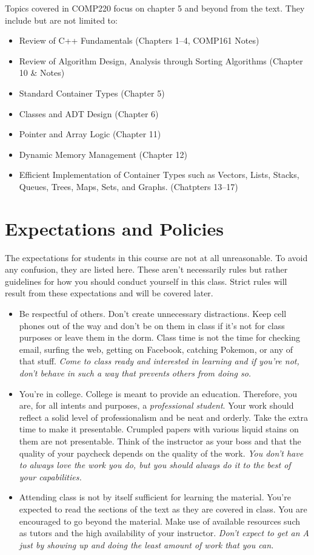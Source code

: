 \documentclass[nobib]{tufte-handout}
\begin{document}
Topics covered in COMP220 focus on chapter 5 and beyond from the text. They include but are not limited to:
\begin{itemize}
\item Review of C++ Fundamentals (Chapters 1--4, COMP161 Notes)
\item Review of Algorithm Design, Analysis through Sorting Algorithms (Chapter 10 \& Notes)
\item Standard Container Types (Chapter 5)
\item Classes and ADT Design (Chapter 6)
\item Pointer and Array Logic (Chapter 11)
\item Dynamic Memory Management (Chapter 12)
\item Efficient Implementation of Container Types such as Vectors, Lists, Stacks, Queues, Trees, Maps, Sets, and Graphs. (Chatpters 13--17)
\end{itemize}


\section{Expectations and Policies}
The expectations for students in this course are not at all unreasonable.  To avoid any confusion, they are listed here.  These aren't necessarily rules but rather guidelines for how you should conduct yourself in this class.  Strict rules will result from these expectations and will be covered later.
\begin{itemize}
\item Be respectful of others.  Don't create unnecessary distractions.  Keep cell phones out of the way and don't be on them in class if it's not for class purposes or leave them in the dorm.  Class time is not the time for checking email, surfing the web, getting on Facebook, catching Pokemon, or any of that stuff. \textit{Come to class ready and interested in learning and if you're not, don't behave in such a way that prevents others from doing so.}
\item You're in college.  College is meant to provide an education.  Therefore, you are, for all intents and purposes, a \textit{professional student}.  Your work should reflect a solid level of professionalism and be neat and orderly.  Take the extra time to make it presentable.  Crumpled papers with various liquid stains on them are not presentable.  Think of the instructor as your boss and that the quality of your paycheck depends on the quality of the work.  \textit{You don't have to always love the work you do, but you should always do it to the best of your capabilities.}
\item Attending class is not by itself sufficient for learning the material.  You're expected to read the sections of the text as they are covered in class.  You are encouraged to go beyond the material.  Make use of available resources such as tutors and the high availability of your instructor.  \textit{Don't expect to get an A just by showing up and doing the least amount of work that you can.}
\end{itemize}
\end{document}
